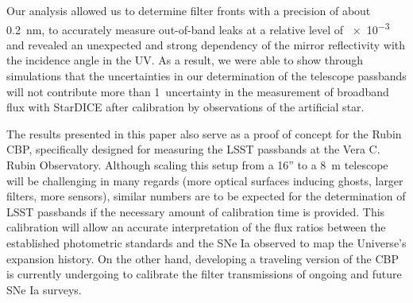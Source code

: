 Our analysis allowed us to determine filter fronts with a precision of
about \SI{0.2}{\nano\meter}, to accurately measure out-of-band leaks at a relative
level of \num{e-3} and revealed an unexpected and strong dependency of
the mirror reflectivity with the incidence angle in the UV. As a
result, we were able to show through simulations that the uncertainties in our determination of the
telescope passbands will not contribute more than 1\textperthousand\
uncertainty in the measurement of broadband flux with StarDICE after
calibration by observations of the artificial star. 

The results presented in this paper also serve as a proof of concept for the Rubin CBP, specifically designed for measuring the LSST passbands at the Vera C. Rubin Observatory. Although scaling this setup from a 16'' to a \SI{8}{\meter} telescope will be challenging in many regards (more optical surfaces inducing ghosts, larger filters, more sensors), similar numbers are to be expected for the determination of LSST passbands if the necessary amount of calibration time is provided. This calibration will allow an accurate interpretation of the flux ratios between the established photometric standards and the SNe Ia observed to map the Universe's expansion history. On the other hand, developing a traveling version of the CBP is currently undergoing \citep{2024RASTI...3..125S} to calibrate the filter transmissions of ongoing and future SNe Ia surveys.

